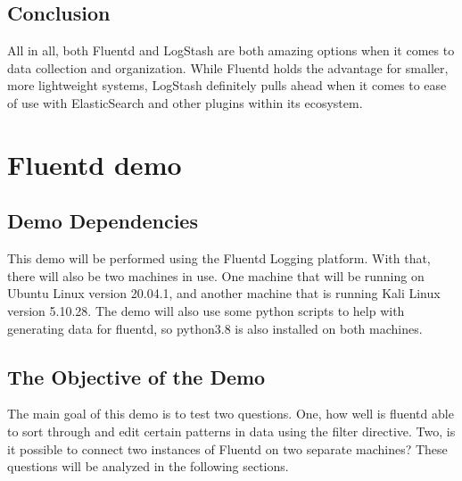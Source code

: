 \subsection{Conclusion}
\quad \quad
All in all, both Fluentd and LogStash are both amazing options when it comes to data collection and organization. While Fluentd holds the advantage for smaller, more lightweight systems, LogStash definitely pulls ahead when it comes to ease of 
use with ElasticSearch and other plugins within its ecosystem.
\section{Fluentd demo} \label{sec:demo}
\subsection{Demo Dependencies}
\quad \quad This demo will be performed using the Fluentd Logging platform. With that, there will also be two machines in use. One machine that will be running on Ubuntu Linux version 20.04.1, and another machine that is running Kali Linux version 5.10.28.
The demo will also use some python scripts to help with generating data for fluentd, so python3.8 is also installed on both machines.
\subsection{The Objective of the Demo}
\quad \quad The main goal of this demo is to test two questions. One, how well is fluentd able to sort through and edit certain patterns in data using the filter directive. Two, is it possible to connect two instances of 
Fluentd on two separate machines? These questions will be analyzed in the following sections.
